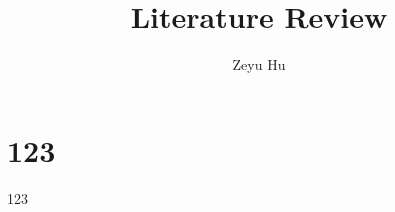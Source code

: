 \documentclass[12pt]{article}
\title{Literature Review}
\author{Zeyu Hu\\
}
\begin{document}
\section{123}

123
\end{document}
